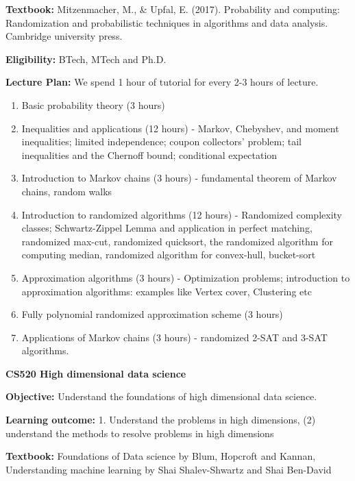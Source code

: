 \documentclass[12pt, a4paper]{letter} %
\begin{document}
\textbf{Textbook:} Mitzenmacher, M., \& Upfal, E. (2017). Probability and computing: Randomization and
probabilistic techniques in algorithms and data analysis. Cambridge university press.

\textbf{Eligibility:} BTech, MTech and Ph.D.



\noindent
\textbf{Lecture Plan:}
We spend 1 hour of tutorial for every 2-3 hours of lecture.
\begin{enumerate}
 \item Basic probability theory (3 hours)
 \item Inequalities and applications (12 hours) - Markov, Chebyshev, and moment inequalities; limited independence; coupon collectors’ problem; tail inequalities
and the Chernoff bound; conditional expectation
\item Introduction to Markov chains (3 hours) - fundamental theorem of Markov chains, random walks
\item Introduction to randomized algorithms (12 hours) - Randomized complexity classes; Schwartz-Zippel Lemma and application in perfect matching, randomized max-cut, randomized quicksort, the randomized algorithm for computing median, randomized algorithm for convex-hull, bucket-sort
 \item Approximation algorithms (3 hours) - Optimization problems; introduction to approximation algorithms: examples like Vertex cover, Clustering etc
\item Fully polynomial randomized approximation scheme (3 hours)
\item Applications of Markov chains (3 hours) - randomized 2-SAT and 3-SAT algorithms.
\end{enumerate}

\newpage
\begin{center}
    \textbf{CS520 High dimensional data science}
\end{center}
\textbf{Objective:} Understand the foundations of high dimensional data science.

\textbf{Learning outcome:} 1. Understand the problems in high dimensions, (2) understand the methods to resolve problems in high dimensions

\textbf{Textbook:} Foundations of Data science by Blum, Hopcroft and Kannan, Understanding machine learning by Shai Shalev-Shwartz and Shai Ben-David
\end{document}
